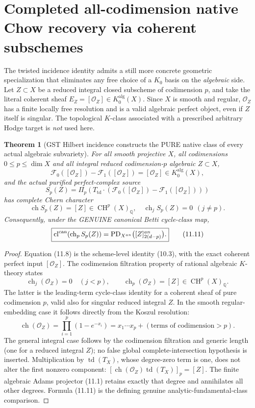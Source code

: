 \documentclass[11pt]{article}
\newcommand{\Q}{\mathbb Q}
\newcommand{\CH}{\operatorname{CH}}
\newcommand{\ch}{\operatorname{ch}}
\newcommand{\td}{\operatorname{td}}
\newcommand{\cl}{\operatorname{cl}}
\newtheorem{theorem}{Theorem}[section]
\begin{document}
\section{Completed all-codimension native Chow recovery via coherent subschemes}
The twisted incidence identity admits a still more concrete
geometric specialization that eliminates any free choice of a
\(K_0\) basis on the \emph{algebraic} side. Let
\(Z\subset X\) be a reduced integral closed subscheme of
codimension \(p\), and take the literal coherent sheaf
\(E_Z=[\mathcal O_Z]\in K_0^{\mathrm{alg}}(X)\).
Since \(X\) is smooth and regular, \(\mathcal O_Z\) has a finite
locally free resolution and is a valid algebraic perfect object,
even if \(Z\) itself is singular. The topological \(K\)-class
associated with a prescribed arbitrary Hodge target is
\emph{not} used here.

\begin{theorem}[GST Hilbert incidence constructs the PURE native class of every actual algebraic subvariety]
For all smooth projective \(X\), all codimensions
\(0\le p\le\dim X\) and all integral reduced
codimension-\(p\) algebraic \(Z\subset X\),
\[
 \boxed{
 \mathcal F_0([\mathcal O_Z])
       -\mathcal F_1([\mathcal O_Z])
       =[\mathcal O_Z]\in K_0^{\mathrm{alg}}(X),
 }                                                       \tag{11.8}
\]
and the actual purified perfect-complex source
\[
 \boxed{
 S_p(Z)=\Pi_p\!\left(
    T_{\td}\cdot
    (\mathcal F_0([\mathcal O_Z])
       -\mathcal F_1([\mathcal O_Z]))
                \right)
 }                                                       \tag{11.9}
\]
has complete Chern character
\[
 \boxed{\ch S_p(Z)=[Z]\in\CH^p(X)_\Q,\quad
               \ch_j S_p(Z)=0\ \ (j\ne p).}        \tag{11.10}
\]
Consequently, under the GENUINE canonical Betti
cycle-class map,
\[
 \boxed{\cl^{\rm can}(\ch_p S_p(Z))
    =\operatorname{PD}_{X^{an}}
      \bigl([Z]^{an}_{2(d-p)}\bigr).}                \tag{11.11}
\]
\end{theorem}
\begin{proof}
Equation (11.8) is the scheme-level identity
(10.3), with the exact coherent perfect input
\([\mathcal O_Z]\).
The codimension filtration property of rational
algebraic \(K\)-theory states
\[
 \ch_j(\mathcal O_Z)=0\quad(j<p),\qquad
 \ch_p(\mathcal O_Z)=[Z]\in\CH^p(X)_\Q.
\]
The latter is the leading-term cycle-class identity
for a coherent sheaf of pure codimension \(p\), valid
also for singular reduced integral \(Z\). In the
smooth regular-embedding case it follows directly
from the Koszul resolution:
\[
 \ch(\mathcal O_Z)=\prod_{i=1}^p(1-e^{-x_i})
   =x_1\cdots x_p+
       (\text{terms of codimension}>p).
\]
The general integral case follows by the codimension
filtration and generic length (one for a reduced
integral \(Z\)); no false global complete-intersection
hypothesis is inserted. Multiplication by
\(\td(T_X)\), whose degree-zero term is one, does
not alter the first nonzero component:
\(
 [\ch(\mathcal O_Z)\td(T_X)]_p=[Z].
\)
The finite algebraic Adams projector (11.1)
retains exactly that degree and annihilates
all other degrees. Formula (11.11) is the defining
genuine analytic-fundamental-class comparison.
\end{proof}
\end{document}
